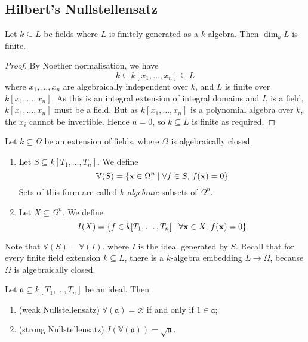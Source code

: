\subsection{Hilbert's Nullstellensatz}
\begin{proposition}
    Let \( k \subseteq L \) be fields where \( L \) is finitely generated as a \( k \)-algebra.
    Then \( \dim_k L \) is finite.
\end{proposition}
\begin{proof}
    By Noether normalisation, we have
    \[ k \subseteq k[x_1, \dots, x_n] \subseteq L \]
    where \( x_1, \dots, x_n \) are algebraically independent over \( k \), and \( L \) is finite over \( k[x_1, \dots, x_n] \).
    As this is an integral extension of integral domains and \( L \) is a field, \( k[x_1, \dots, x_n] \) must be a field.
    But as \( k[x_1, \dots, x_n] \) is a polynomial algebra over \( k \), the \( x_i \) cannot be invertible.
    Hence \( n = 0 \), so \( k \subseteq L \) is finite as required.
\end{proof}
\begin{definition}
    Let \( k \subseteq \Omega \) be an extension of fields, where \( \Omega \) is algebraically closed.
    \begin{enumerate}
        \item Let \( S \subseteq k[T_1, \dots, T_n] \).
        We define
        \[ \mathbb V(S) = \qty{\vb x \in \Omega^n \mid \forall f \in S,\, f(\vb x) = 0} \]
        Sets of this form are called \emph{\( k \)-algebraic} subsets of \( \Omega^n \).
        \item Let \( X \subseteq \Omega^n \).
        We define
        \[ I(X) = \qty{f \in k[T_1, \dots, T_n] \mid \forall \vb x \in X,\, f(\vb x) = 0} \]
    \end{enumerate}
\end{definition}
Note that \( \mathbb V(S) = \mathbb V(I) \), where \( I \) is the ideal generated by \( S \).
Recall that for every finite field extension \( k \subseteq L \), there is a \( k \)-algebra embedding \( L \to \Omega \), because \( \Omega \) is algebraically closed.
\begin{theorem}
    Let \( \mathfrak a \subseteq k[T_1, \dots, T_n] \) be an ideal.
    Then
    \begin{enumerate}
        \item (weak Nullstellensatz) \( \mathbb V(\mathfrak a) = \varnothing \) if and only if \( 1 \in \mathfrak a \);
        \item (strong Nullstellensatz) \( I(\mathbb V(\mathfrak a)) = \sqrt{\mathfrak a} \).
    \end{enumerate}
\end{theorem}

